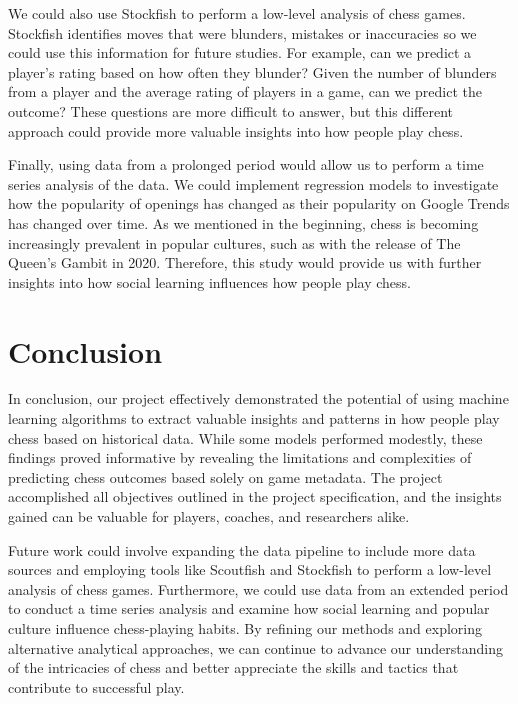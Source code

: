 \documentclass[a4paper, 11pt]{article}
\begin{document}
We could also use Stockfish to perform a low-level analysis of chess games. Stockfish identifies moves that were blunders, mistakes or inaccuracies so we could use this information for future studies. For example, can we predict a player's rating based on how often they blunder? Given the number of blunders from a player and the average rating of players in a game, can we predict the outcome? These questions are more difficult to answer, but this different approach could provide more valuable insights into how people play chess.

Finally, using data from a prolonged period would allow us to perform a time series analysis of the data. We could implement regression models to investigate how the popularity of openings has changed as their popularity on Google Trends has changed over time. As we mentioned in the beginning, chess is becoming increasingly prevalent in popular cultures, such as with the release of The Queen's Gambit in 2020. Therefore, this study would provide us with further insights into how social learning influences how people play chess.

\section{Conclusion}
In conclusion, our project effectively demonstrated the potential of using machine learning algorithms to extract valuable insights and patterns in how people play chess based on historical data. While some models performed modestly, these findings proved informative by revealing the limitations and complexities of predicting chess outcomes based solely on game metadata. The project accomplished all objectives outlined in the project specification, and the insights gained can be valuable for players, coaches, and researchers alike.

Future work could involve expanding the data pipeline to include more data sources and employing tools like Scoutfish and Stockfish to perform a low-level analysis of chess games. Furthermore, we could use data from an extended period to conduct a time series analysis and examine how social learning and popular culture influence chess-playing habits. By refining our methods and exploring alternative analytical approaches, we can continue to advance our understanding of the intricacies of chess and better appreciate the skills and tactics that contribute to successful play.

\newpage


\end{document}

